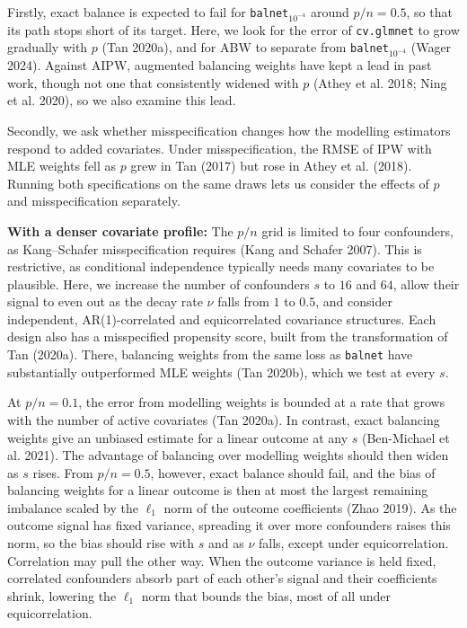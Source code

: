 \documentclass[
  12pt,
  a4paper,
]{article}
\begin{document}
Firstly, exact balance is expected to fail for
\texttt{balnet}\(_{10^{-4}}\) around \(p/n = 0.5\), so that its path
stops short of its target. Here, we look for the error of
\texttt{cv.glmnet} to grow gradually with \(p\) (Tan 2020a), and for ABW
to separate from \texttt{balnet}\(_{10^{-4}}\) (Wager 2024). Against
AIPW, augmented balancing weights have kept a lead in past work, though
not one that consistently widened with \(p\) (Athey et al. 2018; Ning et
al. 2020), so we also examine this lead.

Secondly, we ask whether misspecification changes how the modelling
estimators respond to added covariates. Under misspecification, the RMSE
of IPW with MLE weights fell as \(p\) grew in Tan (2017) but rose in
Athey et al. (2018). Running both specifications on the same draws lets
us consider the effects of \(p\) and misspecification separately.

\textbf{With a denser covariate profile:} The \(p/n\) grid is limited to
four confounders, as Kang--Schafer misspecification requires (Kang and
Schafer 2007). This is restrictive, as conditional independence
typically needs many covariates to be plausible. Here, we increase the
number of confounders \(s\) to \(16\) and \(64\), allow their signal to
even out as the decay rate \(\nu\) falls from \(1\) to \(0.5\), and
consider independent, AR(1)-correlated and equicorrelated covariance
structures. Each design also has a misspecified propensity score, built
from the transformation of Tan (2020a). There, balancing weights from
the same loss as \texttt{balnet} have substantially outperformed MLE
weights (Tan 2020b), which we test at every \(s\).

At \(p/n = 0.1\), the error from modelling weights is bounded at a rate
that grows with the number of active covariates (Tan 2020a). In
contrast, exact balancing weights give an unbiased estimate for a linear
outcome at any \(s\) (Ben-Michael et al. 2021). The advantage of
balancing over modelling weights should then widen as \(s\) rises. From
\(p/n = 0.5\), however, exact balance should fail, and the bias of
balancing weights for a linear outcome is then at most the largest
remaining imbalance scaled by the \(\ell_1\) norm of the outcome
coefficients (Zhao 2019). As the outcome signal has fixed variance,
spreading it over more confounders raises this norm, so the bias should
rise with \(s\) and as \(\nu\) falls, except under equicorrelation.
Correlation may pull the other way. When the outcome variance is held
fixed, correlated confounders absorb part of each other's signal and
their coefficients shrink, lowering the \(\ell_1\) norm that bounds the
bias, most of all under equicorrelation.
\end{document}
